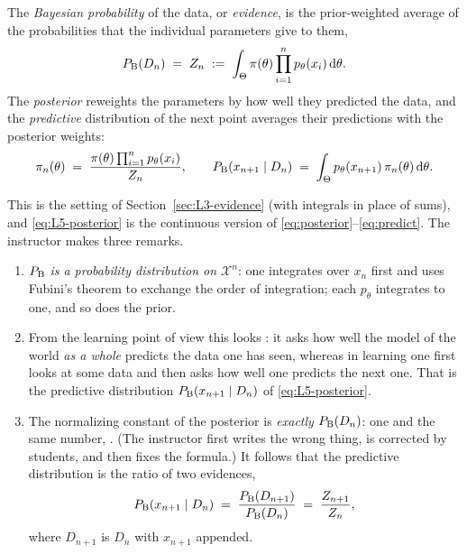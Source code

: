\begin{defn}\label{def:L5-bayes}
The \emph{Bayesian probability} of the data, or \emph{evidence}, is the prior-weighted average of the probabilities that the individual parameters give to them,
\begin{equation}\label{eq:L5-mixture}
  P_{\mathrm{B}}(D_n)\;=\;Z_n\;:=\;\int_\Theta\pi(\theta)\prod_{i=1}^np_\theta(x_i)\,\mathrm{d}\theta .
\end{equation}
The \emph{posterior} reweights the parameters by how well they predicted the data, and the \emph{predictive} distribution of the next point averages their predictions with the posterior weights:
\begin{equation}\label{eq:L5-posterior}
  \pi_n(\theta)\;=\;\frac{\pi(\theta)\prod_{i=1}^np_\theta(x_i)}{Z_n},\qquad
  P_{\mathrm{B}}(x_{n+1}\mid D_n)\;=\;\int_\Theta p_\theta(x_{n+1})\,\pi_n(\theta)\,\mathrm{d}\theta .
\end{equation}
\end{defn}
This is the setting of Section~\ref{sec:L3-evidence} (with integrals in place of sums), and \eqref{eq:L5-posterior} is the continuous version of \eqref{eq:posterior}--\eqref{eq:predict}. The instructor makes three remarks.
\begin{enumerate}[label=\textbf{(\alph*)}]
  \item $P_{\mathrm{B}}$ \emph{is a probability distribution on $\mathcal X^n$}: one integrates over $x_n$ first and uses Fubini's theorem to exchange the order of integration; each $p_\theta$ integrates to one, and so does the prior.
  \item From the learning point of view this looks : it asks how well the model of the world \emph{as a whole} predicts the data one has seen, whereas in learning one first looks at some data and then asks how well one predicts the next one. That is the predictive distribution $P_{\mathrm{B}}(x_{n+1}\mid D_n)$ of \eqref{eq:L5-posterior}.
  \item The normalizing constant of the posterior is \emph{exactly} $P_{\mathrm{B}}(D_n)$: one and the same number, . (The instructor first writes the wrong thing, is corrected by students, and then fixes the formula.) It follows that the predictive distribution is the ratio of two evidences,
  \begin{equation}\label{eq:L5-ratio}
     P_{\mathrm{B}}(x_{n+1}\mid D_n)\;=\;\frac{P_{\mathrm{B}}(D_{n+1})}{P_{\mathrm{B}}(D_n)}\;=\;\frac{Z_{n+1}}{Z_n},
  \end{equation}
  where $D_{n+1}$ is $D_n$ with $x_{n+1}$ appended.
\end{enumerate}

